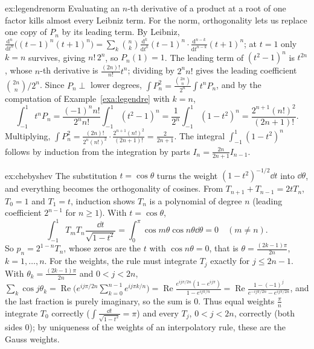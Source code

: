 \begin{solution}{ex:legendrenorm}
\idea Evaluating an $n$-th derivative of a product at a root of one factor kills almost every Leibniz term. For the
norm, orthogonality lets us replace one copy of $P_n$ by its leading term.
\writeup By Leibniz, $\frac{\mathrm d^n}{\mathrm dt^n}\bigl((t-1)^n(t+1)^n\bigr)=\sum_k\binom nk\frac{\mathrm d^k}{\mathrm
dt^k}(t-1)^n\cdot\frac{\mathrm d^{n-k}}{\mathrm dt^{n-k}}(t+1)^n$; at $t=1$ only $k=n$ survives, giving $n!\,2^n$, so
$P_n(1)=1$. The leading term of $(t^2-1)^n$ is $t^{2n}$, whose $n$-th derivative is $\frac{(2n)!}{n!}t^n$; dividing by
$2^nn!$ gives the leading coefficient $\binom{2n}n/2^n$. Since $P_n\perp$ lower degrees, $\int P_n^2=\frac{\binom{2n}n}{2^n}
\int t^nP_n$, and by the computation of Example~\ref{exa:legendre} with $k=n$,
\[
\int_{-1}^1t^nP_n=\frac{(-1)^nn!}{2^nn!}\int_{-1}^1(t^2-1)^n=\frac1{2^n}\int_{-1}^1(1-t^2)^n=\frac{2^{n+1}(n!)^2}{(2n+1)!}.
\]
Multiplying, $\int P_n^2=\frac{(2n)!}{2^n(n!)^2}\cdot\frac{2^{n+1}(n!)^2}{(2n+1)!}=\frac2{2n+1}$. The integral $\int_{-1}^1(1-t^2)^n$
follows by induction from the integration by parts $I_n=\frac{2n}{2n+1}I_{n-1}$.
\end{solution}

\begin{solution}{ex:chebyshev}
\idea The substitution $t=\cos\theta$ turns the weight $(1-t^2)^{-1/2}\dd t$ into $\dd\theta$, and everything becomes
the orthogonality of cosines.
\writeup From $T_{n+1}+T_{n-1}=2tT_n$, $T_0=1$ and $T_1=t$, induction shows $T_n$ is a polynomial of degree $n$
(leading coefficient $2^{n-1}$ for $n\ge1$). With $t=\cos\theta$,
\[
\int_{-1}^1T_mT_n\frac{\dd t}{\sqrt{1-t^2}}=\int_0^\pi\cos m\theta\cos n\theta\dd\theta=0\quad(m\ne n).
\]
So $p_n=2^{1-n}T_n$, whose zeros are the $t$ with $\cos n\theta=0$, that is $\theta=\frac{(2k-1)\pi}{2n}$, $k=1,\dots,n$.
For the weights, the rule must integrate $T_j$ exactly for $j\le2n-1$. With $\theta_k=\frac{(2k-1)\pi}{2n}$ and $0<j<2n$,
$\sum_k\cos j\theta_k=\operatorname{Re}\bigl(e^{ij\pi/2n}\sum_{k=0}^{n-1}e^{ij\pi k/n}\bigr)=\operatorname{Re}\frac{e^{ij\pi/2n}
(1-e^{ij\pi})}{1-e^{ij\pi/n}}=\operatorname{Re}\frac{1-(-1)^j}{e^{-ij\pi/2n}-e^{ij\pi/2n}}$, and the last fraction is purely
imaginary, so the sum is $0$. Thus equal weights $\frac\pi n$ integrate $T_0$ correctly ($\int\frac{\dd t}{\sqrt{1-t^2}}=\pi$)
and every $T_j$, $0<j<2n$, correctly (both sides $0$); by uniqueness of the weights of an interpolatory rule, these are the
Gauss weights.
\end{solution}

